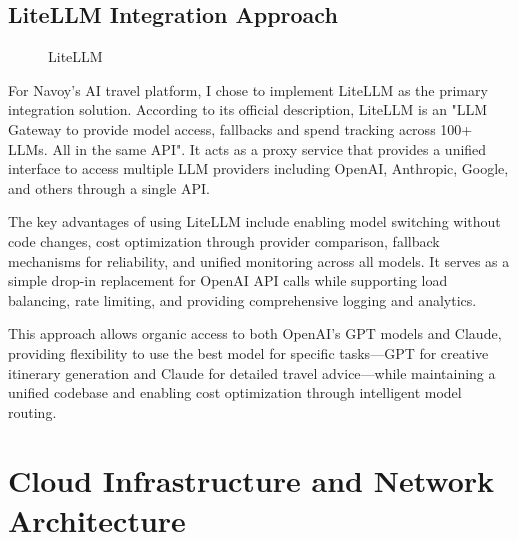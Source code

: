 \subsection{LiteLLM Integration Approach}
\begin{figure}[H]
    \centering
    \caption{LiteLLM}
    \label{fig:litellm}
\end{figure}

For Navoy's AI travel platform, I chose to implement LiteLLM as the primary integration solution. According to its official description, LiteLLM is an "LLM Gateway to provide model access, fallbacks and spend tracking across 100+ LLMs. All in the same API"\cite{litellm}. It acts as a proxy service that provides a unified interface to access multiple LLM providers including OpenAI, Anthropic, Google, and others through a single API.

The key advantages of using LiteLLM include enabling model switching without code changes, cost optimization through provider comparison, fallback mechanisms for reliability, and unified monitoring across all models. It serves as a simple drop-in replacement for OpenAI API calls while supporting load balancing, rate limiting, and providing comprehensive logging and analytics.

This approach allows organic access to both OpenAI's GPT models and Claude, providing flexibility to use the best model for specific tasks—GPT for creative itinerary generation and Claude for detailed travel advice—while maintaining a unified codebase and enabling cost optimization through intelligent model routing.

\section{Cloud Infrastructure and Network Architecture}

